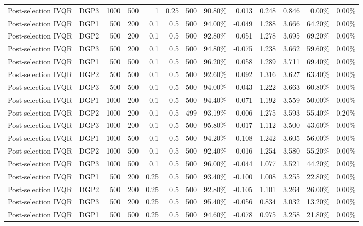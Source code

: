 \begin{landscape}
\begin{longtable}{llrrrrrrrrrrr}
Post-selection IVQR & DGP3 & 1000 & 500 & 1 & 0.25 & 500 & 90.80\% & 0.013 & 0.248 & 0.846 & 0.00\% & 0.00\% \\
Post-selection IVQR & DGP1 & 500 & 200 & 0.1 & 0.5 & 500 & 94.00\% & -0.049 & 1.288 & 3.666 & 64.20\% & 0.00\% \\
Post-selection IVQR & DGP2 & 500 & 200 & 0.1 & 0.5 & 500 & 92.80\% & 0.051 & 1.278 & 3.695 & 69.20\% & 0.00\% \\
Post-selection IVQR & DGP3 & 500 & 200 & 0.1 & 0.5 & 500 & 94.80\% & -0.075 & 1.238 & 3.662 & 59.60\% & 0.00\% \\
Post-selection IVQR & DGP1 & 500 & 500 & 0.1 & 0.5 & 500 & 96.20\% & 0.058 & 1.289 & 3.711 & 69.40\% & 0.00\% \\
Post-selection IVQR & DGP2 & 500 & 500 & 0.1 & 0.5 & 500 & 92.60\% & 0.092 & 1.316 & 3.627 & 63.40\% & 0.00\% \\
Post-selection IVQR & DGP3 & 500 & 500 & 0.1 & 0.5 & 500 & 94.00\% & 0.043 & 1.222 & 3.663 & 60.80\% & 0.00\% \\
Post-selection IVQR & DGP1 & 1000 & 200 & 0.1 & 0.5 & 500 & 94.40\% & -0.071 & 1.192 & 3.559 & 50.00\% & 0.00\% \\
Post-selection IVQR & DGP2 & 1000 & 200 & 0.1 & 0.5 & 499 & 93.19\% & -0.006 & 1.275 & 3.593 & 55.40\% & 0.20\% \\
Post-selection IVQR & DGP3 & 1000 & 200 & 0.1 & 0.5 & 500 & 95.80\% & -0.017 & 1.112 & 3.500 & 43.60\% & 0.00\% \\
Post-selection IVQR & DGP1 & 1000 & 500 & 0.1 & 0.5 & 500 & 94.20\% & 0.108 & 1.242 & 3.605 & 56.00\% & 0.00\% \\
Post-selection IVQR & DGP2 & 1000 & 500 & 0.1 & 0.5 & 500 & 92.40\% & 0.016 & 1.254 & 3.580 & 55.20\% & 0.00\% \\
Post-selection IVQR & DGP3 & 1000 & 500 & 0.1 & 0.5 & 500 & 96.00\% & -0.044 & 1.077 & 3.521 & 44.20\% & 0.00\% \\
Post-selection IVQR & DGP1 & 500 & 200 & 0.25 & 0.5 & 500 & 93.40\% & -0.100 & 1.008 & 3.255 & 22.80\% & 0.00\% \\
Post-selection IVQR & DGP2 & 500 & 200 & 0.25 & 0.5 & 500 & 92.80\% & -0.105 & 1.101 & 3.264 & 26.00\% & 0.00\% \\
Post-selection IVQR & DGP3 & 500 & 200 & 0.25 & 0.5 & 500 & 95.40\% & -0.056 & 0.834 & 3.032 & 13.20\% & 0.00\% \\
Post-selection IVQR & DGP1 & 500 & 500 & 0.25 & 0.5 & 500 & 94.60\% & -0.078 & 0.975 & 3.258 & 21.80\% & 0.00\% \\

\end{longtable}
\end{landscape}
